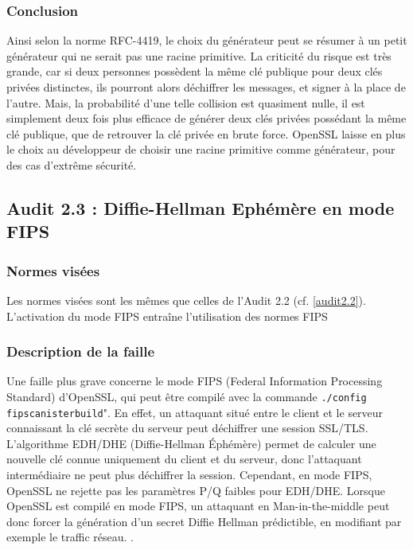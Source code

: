 		\subsubsection{Conclusion}

		Ainsi selon la norme RFC-4419, le choix du générateur peut se résumer à un petit générateur qui ne serait pas une racine primitive. La criticité du risque est très grande, car si deux personnes possèdent la même clé publique pour deux clés privées distinctes, ils pourront alors déchiffrer les messages, et signer à la place de l'autre. Mais, la probabilité d'une telle collision est quasiment nulle, il est simplement deux fois plus efficace de générer deux clés privées possédant la même clé publique, que de retrouver la clé privée en brute force.
		OpenSSL laisse en plus le choix au développeur de choisir une racine primitive comme générateur, pour des cas d'extrême sécurité.
		
	\subsection{Audit 2.3 : Diffie-Hellman Ephémère en mode FIPS}
		\subsubsection{Normes visées}

		Les normes visées sont les mêmes que celles de l'Audit 2.2 (cf. \ref{audit2.2}).\\
		L'activation du mode FIPS entraîne l'utilisation des normes FIPS \cite{fips186-4} \cite{fips140-2}

		\subsubsection{Description de la faille}
	
		Une faille plus grave concerne le mode FIPS (Federal Information Processing Standard) d'OpenSSL, qui peut être compilé avec la commande \texttt{./config fipscanisterbuild}". En effet, un attaquant situé entre le client et le serveur connaissant la clé secrète du serveur peut déchiffrer une session SSL/TLS. \\
	
		L'algorithme EDH/DHE (Diffie-Hellman Éphémère) permet de calculer une nouvelle clé connue uniquement du client et du serveur, donc l'attaquant intermédiaire ne peut plus déchiffrer la session. Cependant, en mode FIPS, OpenSSL ne rejette pas les paramètres P/Q faibles pour EDH/DHE. Lorsque OpenSSL est compilé en mode FIPS, un attaquant en Man-in-the-middle peut donc forcer la génération d'un secret Diffie Hellman prédictible, en modifiant par exemple le traffic réseau. \cite{vigilance-vul-10585} \cite{CVE-2011-5095}.

